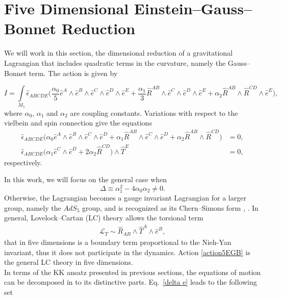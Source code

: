 \documentclass[aps,prd,12pt,superscriptaddress,showpacs,showkeys,longbibliography,reprint]{revtex4-1}
\begin{document}
\section{Five Dimensional Einstein--Gauss--Bonnet Reduction\label{5EGB}}
We will work in this section, the dimensional reduction of a gravitational Lagrangian that includes quadratic terms in the curvature, namely the Gauss--Bonnet term. The action is given by
\begin{widetext}
  \begin{equation}\label{action5EGB}
    I=\int\limits_{M_5}\hat{\epsilon}_{ABCDE}\Big(\frac{\alpha_0}{5}\hat{e}^A\wedge\hat{e}^B\wedge\hat{e}^C\wedge
    \hat{e}^D\wedge\hat{e}^E
    +\frac{\alpha_1}{3}\hat{R}^{AB}\wedge\hat{e}^C\wedge\hat{e}^D\wedge\hat{e}^E
    +\alpha_2\hat{R}^{AB}\wedge\hat{R}^{CD}
    \wedge\hat{e}^E\Big),
  \end{equation}
where $\alpha_0$, $\alpha_1$ and $\alpha_2$ are coupling constants. Variations with respect to the vielbein and spin connection give the equations
  \begin{align}\label{delta e}
    \hat{\epsilon}_{ABCDE}\Big(\alpha_0\hat{e}^A\wedge\hat{e}^B\wedge\hat{e}^C\wedge\hat{e}^D
    +\alpha_1\hat{R}^{AB}\wedge\hat{e}^C\wedge\hat{e}^D
    +\alpha_2\hat{R}^{AB}\wedge\hat{R}^{CD}\Big)&=0,
    \\\label{delta w}
    \hat{\epsilon}_{ABCDE}\Big(\alpha_1\hat{e}^C\wedge\hat{e}^D+
    2\alpha_2\hat{R}^{CD}\Big)\wedge\hat{T}^E&=0,
  \end{align}
  respectively. 
\end{widetext}
In this work, we will focus on the general case when
\begin{equation}\label{delta}
\Delta\equiv\alpha_1^2-4\alpha_0\alpha_2\neq 0.
\end{equation}
Otherwise, the Lagrangian becomes a gauge invariant Lagrangian for a larger group, namely the $AdS_5$ group, and is recognized as its Chern--Simons form \cite{Zanelli:2005sa}, \cite{Troncoso:1999pk}. In general, Lovelock--Cartan (LC) theory allows the torsional term
\begin{align*}
\mathcal{L}_{T}\sim\hat{R}_{AB}\wedge\hat{T}^A\wedge\hat{e}^B,
\end{align*}
that in five dimensions is a boundary term proportional to the Nieh-Yan invariant, thus it does not participate in the dynamics. Action \eqref{action5EGB} is the general LC theory in five dimensions.\\
In terms of the KK ansatz presented in previous sections, the equations of motion can be decomposed in to its distinctive parts. Eq.~\eqref{delta e} leads to the following set
\end{document}
